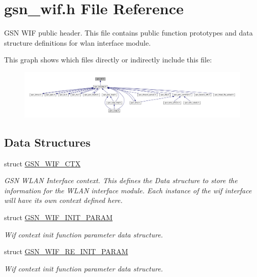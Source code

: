 \hypertarget{a00605}{
\section{gsn\_\-wif.h File Reference}
\label{a00605}
}


GSN WIF public header. This file contains public function prototypes and data structure definitions for wlan interface module.  


This graph shows which files directly or indirectly include this file:
\nopagebreak
\begin{figure}[H]
\begin{center}
\leavevmode
\includegraphics[width=400pt]{a00852}
\end{center}
\end{figure}
\subsection*{Data Structures}
\begin{DoxyCompactItemize}
\item 
struct \hyperlink{a00323}{GSN\_\-WIF\_\-CTX}
\begin{DoxyCompactList}\small\item\em GSN WLAN Interface context. This defines the Data structure to store the information for the WLAN interface module. Each instance of the wif interface will have its own context defined here. \end{DoxyCompactList}\item 
struct \hyperlink{a00338}{GSN\_\-WIF\_\-INIT\_\-PARAM}
\begin{DoxyCompactList}\small\item\em Wif context init function parameter data structure. \end{DoxyCompactList}\item 
struct \hyperlink{a00342}{GSN\_\-WIF\_\-RE\_\-INIT\_\-PARAM}
\begin{DoxyCompactList}\small\item\em Wif context init function parameter data structure. \end{DoxyCompactList}\end{DoxyCompactItemize}
